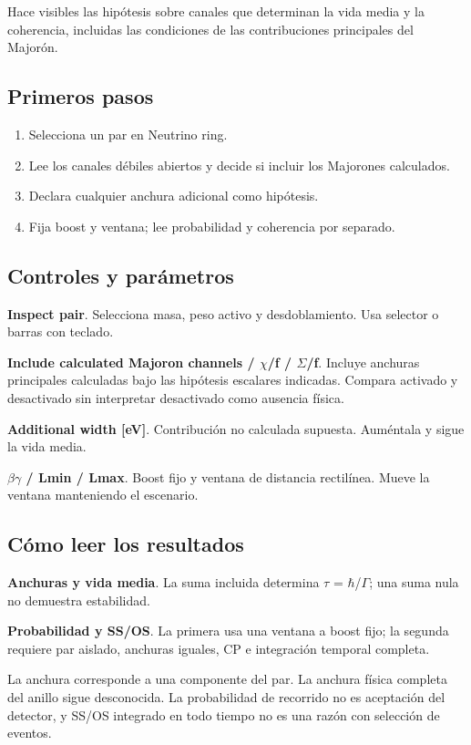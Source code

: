 \documentclass[11pt,a4paper]{article}
\begin{document}
Hace visibles las hipótesis sobre canales que determinan la vida media y la coherencia, incluidas las condiciones de las contribuciones principales del Majorón.
\subsection*{Primeros pasos}
\begin{enumerate}
\item Selecciona un par en Neutrino ring.
\item Lee los canales débiles abiertos y decide si incluir los Majorones calculados.
\item Declara cualquier anchura adicional como hipótesis.
\item Fija boost y ventana; lee probabilidad y coherencia por separado.
\end{enumerate}
\subsection*{Controles y parámetros}
\textbf{Inspect pair}. Selecciona masa, peso activo y desdoblamiento. Usa selector o barras con teclado.

\textbf{Include calculated Majoron channels / \ensuremath{\chi}/f / \ensuremath{\Sigma}/f}. Incluye anchuras principales calculadas bajo las hipótesis escalares indicadas. Compara activado y desactivado sin interpretar desactivado como ausencia física.

\textbf{Additional width [eV]}. Contribución no calculada supuesta. Auméntala y sigue la vida media.

\textbf{\ensuremath{\beta}\ensuremath{\gamma} / Lmin / Lmax}. Boost fijo y ventana de distancia rectilínea. Mueve la ventana manteniendo el escenario.

\subsection*{Cómo leer los resultados}
\textbf{Anchuras y vida media}. La suma incluida determina \ensuremath{\tau} = \ensuremath{\hbar}/\ensuremath{\Gamma}; una suma nula no demuestra estabilidad.

\textbf{Probabilidad y SS/OS}. La primera usa una ventana a boost fijo; la segunda requiere par aislado, anchuras iguales, CP e integración temporal completa.

La anchura corresponde a una componente del par. La anchura física completa del anillo sigue desconocida. La probabilidad de recorrido no es aceptación del detector, y SS/OS integrado en todo tiempo no es una razón con selección de eventos.
\end{document}
